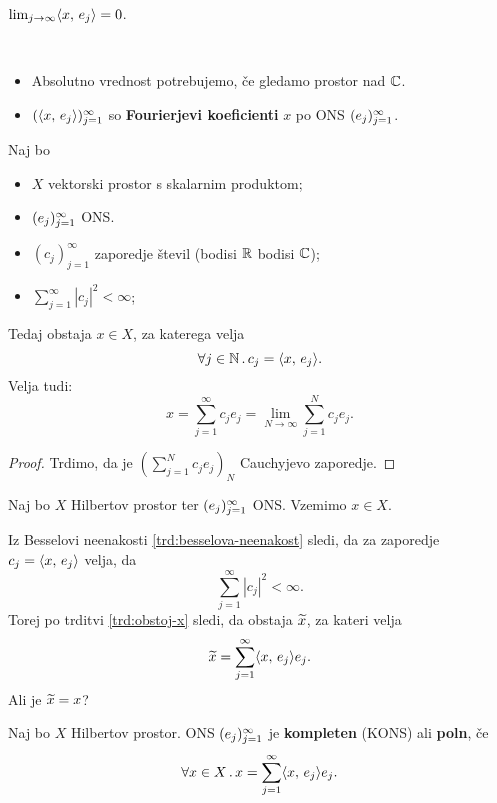 \begin{posledica}
    \(\lim_{j \to \infty} \langle x, \, e_j \rangle = 0\).
\end{posledica}

\begin{opomba} \
    \begin{itemize}
        \item Absolutno vrednost potrebujemo, če gledamo prostor nad \(\mathbb{C}\).
        \item \((\langle x, \, e_j \rangle)_{j = 1}^\infty\) so \textbf{Fourierjevi koeficienti} \(x\) po ONS \((e_j)_{j=1}^\infty\).
    \end{itemize}
\end{opomba}

\begin{trditev}
    \label{trd:obstoj-x}
    Naj bo 
    \begin{itemize}
        \item \(X\) vektorski prostor s skalarnim produktom;
        \item \((e_j)_{j=1}^\infty\) ONS.
        \item \((c_j)_{j=1}^\infty\) zaporedje števil (bodisi \(\mathbb{R}\) bodisi \(\mathbb{C}\));
        \item \(\sum_{j=1}^{\infty} |c_j|^2 < \infty\);
    \end{itemize}
    Tedaj obstaja \(x \in X\), za katerega velja 
    \[\forall j \in \mathbb{N} \,.\, c_j = \langle x, \, e_j \rangle.\]
    Velja tudi:
    \[x = \sum_{j = 1}^{\infty}c_je_j = \lim_{N \to \infty} \sum_{j=1}^{N}c_je_j.\]
\end{trditev}

\begin{proof}
    Trdimo, da je \(\left(\sum_{j=1}^{N}c_je_j\right)_N\) Cauchyjevo zaporedje.
\end{proof}

\begin{opomba}
    Naj bo \(X\) Hilbertov prostor ter \((e_j)_{j=1}^\infty\) ONS. Vzemimo \(x \in X\). 
    
    Iz Besselovi neenakosti \ref{trd:besselova-neenakost} sledi, da za zaporedje \(c_j = \langle x, \, e_j \rangle\) velja, da 
    \[\sum_{j=1}^{\infty} |c_j|^2 < \infty.\]
    Torej po trditvi \ref{trd:obstoj-x} sledi, da obstaja \(\widetilde{x}\), za kateri velja
    \[
    \widetilde{x} = \sum_{j=1}^{\infty} \langle x, \, e_j \rangle e_j.
    \]
    Ali je \(\widetilde{x} = x\)?
\end{opomba}

\begin{definicija}
    Naj bo \(X\) Hilbertov prostor. ONS \((e_j)_{j=1}^\infty\) je \textbf{kompleten} (KONS) ali \textbf{poln}, če 
    \[\forall x \in X \,.\, x = \sum_{j=1}^{\infty} \langle x, \, e_j \rangle e_j.\]
\end{definicija}

